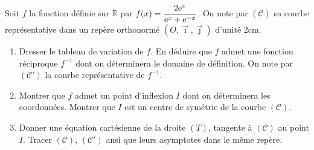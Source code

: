 \begin{exo}
Soit $f$ la fonction d\'efinie sur $\mathbb{R}$ par 
$\displaystyle{f(x) = \frac{ 2 \mathrm{e}^{x} }{ \mathrm{e}^{x} + \mathrm{e}^{-x} } }$.
On note par $(\mathscr{C})$ sa courbe repr\'esentative 
dans un rep\`ere orthonorm\'e $(O,\vec{\imath},\vec{\jmath})$ d'unit\'e 2cm.
\begin{enumerate}
      \item Dresser le tableau de variation de $f$.
            En d\'eduire que $f$ admet une fonction r\'eciproque $f^{-1}$ dont on d\'eterminera le domaine de d\'efinition.
            On note par $(\mathscr{C}')$ la courbe repr\'esentative de $f^{-1}$.
      \item Montrer que $f$ admet un point d'inflexion $I$ dont on d\'eterminera les coordonn\'ees.
            Montrer que $I$ est un centre de sym\'etrie de la courbe $(\mathscr{C})$.
      \item Donner une \'equation cart\'esienne de la droite $(T)$, tangente \`a $(\mathscr{C})$ au point $I$.
            Tracer $(\mathscr{C})$, $(\mathscr{C}')$ ansi que leurs asymptotes dans le m\^eme rep\`ere.
\end{enumerate}
\end{exo}
